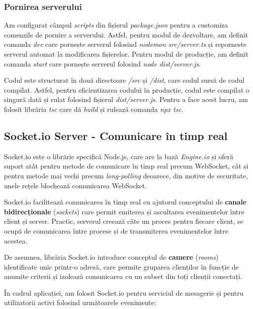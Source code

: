 \subsubsection{Pornirea serverului}
Am configurat câmpul \textit{scripts} din fișierul \textit{package.json} pentru a customiza
comenzile de pornire a serverului. Astfel, pentru modul de dezvoltare, am definit comanda
\textit{dev} care pornește serverul folosind \textit{nodemon src/server.ts} și reporneste serverul
automat la modificarea fișierelor. Pentru modul de producție, am definit comanda \textit{start}
care pornește serverul folosind \textit{node dist/server.js}.
\par
Codul este structurat în două directoare \textit{/src} și \textit{/dist}, care codul sursă de codul compilat.
Astfel, pentru eficientizarea codului în producție, codul este compilat o singură dată și rulat
folosind fișierul \textit{dist/server.js}. Pentru a face acest lucru, am folosit librăria \textit{tsc}
care dă \textit{build} și rulează comanda \textit{npx tsc}.

\subsection{Socket.io Server - Comunicare în timp real}
\label{subsec:socketio}
Socket.io este o librărie specifică Node.js, care are la bază \textit{Engine.io} și oferă
suport atât pentru metode de comunicare în timp real precum WebSocket, cât și pentru metode
mai vechi precum \textit{long-polling} deoarece, din motive de securitate, unele rețele blochează
comunicarea WebSocket. 
\par
Socket.io facilitează comunicarea în timp real cu ajutorul conceptului de \textbf{canale bidirecționale} (\textit{sockets})
care permit emiterea și ascultarea evenimentelor între client și server. Practic, serverul creează câte un proces
pentru fiecare client, se ocupă de comunicarea între procese și de transmiterea evenimentelor între acestea.
\par
De asemnea, librăria Socket.io introduce conceptul de \textbf{camere} (\textit{rooms}) identificate unic
printr-o adresă, care permite gruparea clienților în funcție de anumite criterii și izolează comunicarea cu
un subset din toți clienții conectați.
\par
În cadrul aplicației, am folosit Socket.io pentru serviciul de mesagerie și pentru utilizatorii activi folosind
următoarele evenimente:

